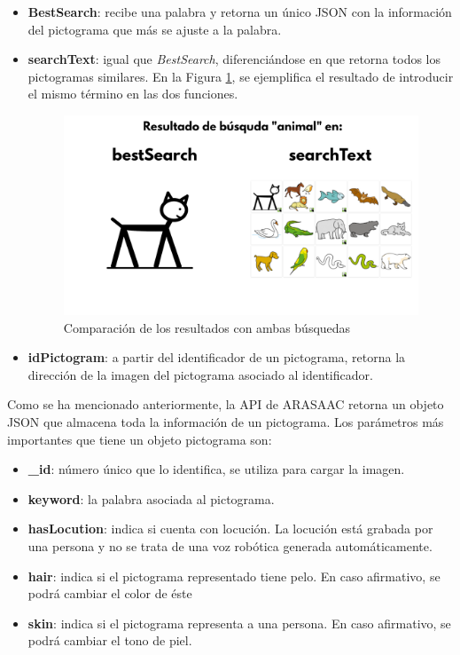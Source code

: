 \begin{itemize}
	\item \textbf{BestSearch}: recibe una palabra y retorna un único JSON con la información del pictograma que más se ajuste a la palabra.
	
	\item \textbf{searchText}: igual que \textit{BestSearch}, diferenciándose en que retorna todos los pictogramas similares. En la Figura \ref{fig:compBusq}, se ejemplifica el resultado de introducir el mismo término en las dos funciones.
	
	 \begin{figure}[h!]
	 	\centering
	 	\includegraphics[width=0.8\linewidth]{Imagenes/Bitmap/techComparacionBusquedas}
	 	\caption{Comparación de los resultados con ambas búsquedas}
	 	\label{fig:compBusq}
	 \end{figure}
	
	\item \textbf{idPictogram}: a partir del identificador de un pictograma, retorna la dirección de la imagen del pictograma asociado al identificador.    
\end{itemize}


Como se ha mencionado anteriormente, la API de ARASAAC retorna un objeto JSON que almacena toda la información de un pictograma. Los parámetros más importantes que tiene un objeto pictograma son: 



\begin{itemize}
	\item \textbf{\_id}: número único que lo identifica, se utiliza para cargar la imagen.
	
	\item \textbf{keyword}: la palabra asociada al pictograma.
	
	\item \textbf{hasLocution}: indica si cuenta con locución. La locución está grabada por una persona y no se trata de una voz robótica generada automáticamente.
	
	\item \textbf{hair}: indica si el pictograma representado tiene pelo. En caso afirmativo, se podrá cambiar el color de éste
	
	\item \textbf{skin}: indica si el pictograma representa a una persona. En caso afirmativo, se podrá cambiar el tono de piel. 
	
\end{itemize}

